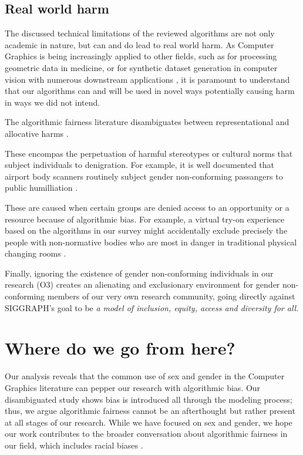 \documentclass[nonacm,sigconf,review,balance=false]{acmart}
\begin{document}
\vspace{-0.1cm}
\subsection{Real world harm}

The discussed technical limitations of the reviewed algorithms are not only academic in nature, but can and do lead to real world harm. As Computer Graphics is being increasingly applied to other fields, such as for processing geometric data in medicine, or for synthetic dataset generation in computer vision with numerous downstream applications \cite{cars, chen2021synthetic, dhs}, it is paramount to understand that our algorithms can and will be used in novel ways potentially causing harm in ways we did not intend.

The algorithmic fairness literature disambiguates between representational and allocative harms \cite{barocas-hardt-narayanan}.

 These encompas the perpetuation of harmful stereotypes or cultural norms that subject individuals to denigration. For example, it is well documented that airport body scanners routinely subject gender non-conforming passangers to public humilliation \cite{tsa}.

 These are caused when certain groups are denied access to an opportunity or a resource because of algorithmic bias. For example, a virtual try-on experience based on the algorithms in our survey might accidentally exclude precisely the people with non-normative bodies who are most in danger in traditional physical changing rooms \cite{changingroom}.

Finally, ignoring the existence of gender non-conforming individuals in our research (O3) creates an alienating and exclusionary environment for gender non-conforming members of our very own research community, going directly against SIGGRAPH's goal to be \emph{a model of inclusion, equity, access and diversity for all}.

\vspace{-0.1cm}
\section{Where do we go from here?}

Our analysis reveals that the common use of sex and gender in the Computer Graphics literature can pepper our research with algorithmic bias. Our disambiguated study shows bias is introduced all through the modeling process; thus, we argue algorithmic fairness cannot be an afterthought but rather present at all stages of our research. While we have focused on sex and gender, we hope our work contributes to the broader conversation about algorithmic fairness in our field, which includes racial biases \cite{kim2021countering}.
\end{document}
